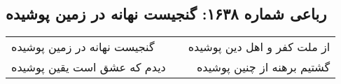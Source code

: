 \begin{center}
\section*{رباعی شماره ۱۶۳۸: گنجیست نهانه در زمین پوشیده}
\label{sec:1638}
\begin{longtable}{l p{0.5cm} r}
گنجیست نهانه در زمین پوشیده
&&
از ملت کفر و اهل دین پوشیده
\\
دیدم که عشق است یقین پوشیده
&&
گشتیم برهنه از چنین پوشیده
\\
\end{longtable}
\end{center}
